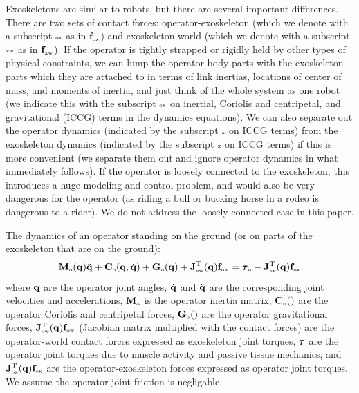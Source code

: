 \documentclass[letterpaper,12pt,fullpage]{article}
\newcommand{\myo}{{\mbox {\tiny o}}}
\newcommand{\myx}{{\mbox {\tiny x}}}
\newcommand{\ox}{{\mbox {\tiny ox}}}
\newcommand{\ow}{{\mbox {\tiny ow}}}
\newcommand{\xw}{{\mbox {\tiny xw}}}
\begin{document}
Exoskeletons are similar to robots, but there are several important differences.
There are two sets of contact forces: operator-exoskeleton (which we denote
with a subscript $\ox$ as in $\vf_{\ox}$) and exoskeleton-world (which we denote
with a subscript $\xw$ as in $\vf_{\xw}$). If the operator is tightly strapped or
rigidly held by other types of physical constraints, we can lump the operator
body parts with the exoskeleton parts which they are attached to in terms
of link inertias, locations of center of mass, and moments of inertia,
and just think of the whole system as one robot (we indicate this with
the subscript $\ox$ on inertial, Coriolis and centripetal, and gravitational (ICCG)
terms in the dynamics equations).
We can also separate out the operator dynamics (indicated by
the subscript $\myo$ on ICCG terms) from the exoskeleton dynamics (indicated by
the subscript $\myx$ on ICCG terms) if this is more convenient
(we separate them out and ignore operator dynamics in what immediately follows).
If the operator is loosely connected to the exoskeleton, this introduces a
huge modeling and control problem, and would also be very dangerous for the
operator (as riding a bull or bucking horse in a rodeo is dangerous to a rider).
We do not address the loosely connected case in this paper.

The dynamics of an operator standing on the ground (or on parts of the exoskeleton
that are on the ground):
\begin{equation}
\mM_{\myo}(\vq) \ddot{\vq} + \mC_{\myo}(\vq,\dot{\vq}) + \mG_{\myo}(\vq)
+ \mJ_{\ow}^{\tr}(\vq) \vf_{\ow} = \vtau_{\myo} - \mJ_{\ox}^{\tr}(\vq) \vf_{\ox}
\label{eq:odynamics}
\end{equation}
where ${\bf q}$ are the operator joint angles,
$\dot{{\bf q}}$ and $\ddot{{\bf q}}$ are the corresponding
joint velocities and accelerations,
$\mM_{\myo}$ is the operator inertia matrix, 
$\mC_{\myo}()$ are the operator Coriolis and
centripetal forces, 
$\mG_{\myo}()$ are the operator gravitational forces,
$\mJ_{\ow}^{\tr}(\vq) \vf_{\ow}$ (Jacobian matrix multiplied with the
contact forces) are the operator-world contact forces 
expressed as exoskeleton joint torques, 
$\vtau$ are the operator joint torques due to muscle activity and passive tissue
mechanics,
and 
$\mJ_{\ox}^{\tr}(\vq) \vf_{\ox}$
are the operator-exoskeleton forces expressed
as operator joint torques.
We assume the operator joint friction is negligable.
\end{document}
